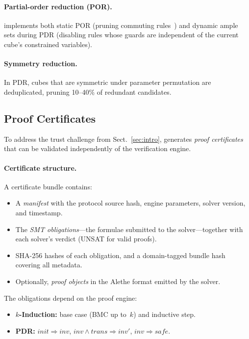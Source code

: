 \paragraph{Partial-order reduction (POR).}
\tarsier{} implements both static POR (pruning commuting
rules~\cite{Peled1993, Godefroid1996}) and dynamic ample sets during
PDR (disabling rules whose guards are independent of the current
cube's constrained variables).

\paragraph{Symmetry reduction.}
In PDR, cubes that are symmetric under parameter permutation are
deduplicated, pruning 10--40\% of redundant candidates.

\subsection{Proof Certificates}\label{sec:certificates}

To address the trust challenge from Sect.~\ref{sec:intro}, \tarsier{}
generates \emph{proof certificates} that can be validated independently
of the verification engine.

\paragraph{Certificate structure.}
A certificate bundle contains:
\begin{itemize}
  \item A \emph{manifest} with the protocol source hash, engine
    parameters, solver version, and timestamp.
  \item The \emph{SMT obligations}---the formulae submitted to the
    solver---together with each solver's verdict (UNSAT for valid
    proofs).
  \item SHA-256 hashes of each obligation, and a domain-tagged bundle
    hash covering all metadata.
  \item Optionally, \emph{proof objects} in the Alethe format emitted
    by the solver.
\end{itemize}

The obligations depend on the proof engine:
\begin{itemize}
  \item \textbf{$k$-Induction:} base case (BMC up to~$k$) and
    inductive step.
  \item \textbf{PDR:}
    $\mathit{init} \Rightarrow \mathit{inv}$,\;
    $\mathit{inv} \wedge \mathit{trans} \Rightarrow \mathit{inv}'$,\;
    $\mathit{inv} \Rightarrow \mathit{safe}$.
\end{itemize}

